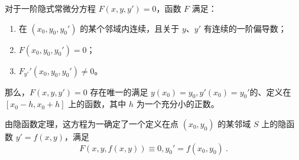 
\begin{issues}
\issueDraft
\end{issues}




对于一阶隐式常微分方程 $F(x, y, y')=0$，函数 $F$ 满足：
\begin{enumerate}
\item 在 $(x_0, y_0, y_0')$ 的某个邻域内连续，且关于 $y$、$y'$ 有连续的一阶偏导数；
\item $F(x_0, y_0, y_0')=0$；
\item $F_{y'}'(x_0, y_0, y_0')\neq 0$。
\end{enumerate}
那么，$F(x, y, y') = 0$ 存在唯一的满足 $y(x_0) = y_0, y'(x_0) = y_0' $的、定义在 $[x_0-h, x_0+h]$ 上的函数，其中 $h$ 为一个充分小的正数。

\sect

由隐函数定理，这方程为一确定了一个定义在点 $(x_0, y_0)$ 的某邻域 $S$ 上的隐函数 $y'=f(x, y)$，满足
$$F(x, y, f(x,y)) \equiv 0, y_0'=f(x_0, y_0) ~.$$